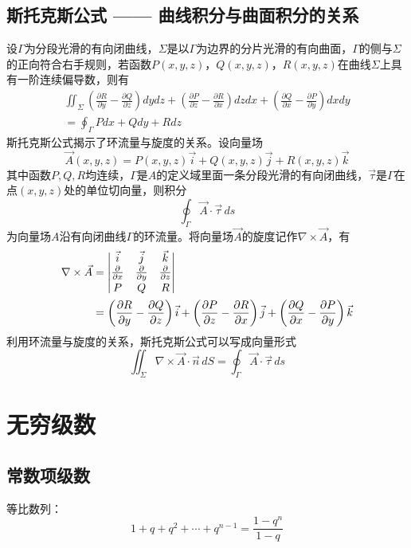 \subsection{斯托克斯公式 —— 曲线积分与曲面积分的关系}
设$\Gamma$为分段光滑的有向闭曲线，$\Sigma$是以$\Gamma$为边界的分片光滑的有向曲面，$\Gamma$的侧与$\Sigma$的正向符合右手规则，若函数$P(x,y,z)$，$Q(x,y,z)$，$R(x,y,z)$在曲线$\Sigma$上具有一阶连续偏导数，则有
\begin{multline*}
\iint_\Sigma\left(\frac{\partial R}{\partial y}-\frac{\partial Q}{\partial z}\right)dydz+
\left(\frac{\partial P}{\partial z}-\frac{\partial R}{\partial x}\right)dzdx+
\left(\frac{\partial Q}{\partial x}-\frac{\partial P}{\partial y}\right)dxdy\\
=\oint_\Gamma Pdx+Qdy+Rdz
\end{multline*}
斯托克斯公式揭示了环流量与旋度的关系。设向量场
\[\vec{A}(x,y,z)=P(x,y,z)\vec{i}+Q(x,y,z)\vec{j}+R(x,y,z)\vec{k}\]
其中函数$P,Q,R$均连续，$\Gamma$是$A$的定义域里面一条分段光滑的有向闭曲线，$\vec{\tau}$是$\Gamma$在点$(x,y,z)$处的单位切向量，则积分
\[\oint_\Gamma \vec{A}\cdot\vec{\tau}\,ds\]
为向量场$A$沿有向闭曲线$\Gamma$的环流量。将向量场$\vec{A}$的旋度记作$\nabla\times \vec{A}$，有
\begin{align*}
\nabla\times\vec{A} &=
\left|
\begin{array}{@{}ccc@{}}
\vec{i}&\vec{j}&\vec{k}\\
\frac{\partial }{\partial x}&\frac{\partial }{\partial y}&\frac{\partial }{\partial z}\\[2pt]
    P&Q&R\\
\end{array}
\right|\\
 &=
\left(\frac{\partial R}{\partial y}-\frac{\partial Q}{\partial z}\right)\vec{i}+
\left(\frac{\partial P}{\partial z}-\frac{\partial R}{\partial x}\right)\vec{j}+
\left(\frac{\partial Q}{\partial x}-\frac{\partial P}{\partial y}\right)\vec{k}
\end{align*}
利用环流量与旋度的关系，斯托克斯公式可以写成向量形式
\[\iint_\Sigma\nabla\times\vec{A}\cdot\vec{n}\,dS=\oint_\Gamma\vec{A}\cdot\vec{\tau}\,ds\]
\section{无穷级数}
\subsection{常数项级数}
等比数列：
\[1+q+q^2+\cdots+q^{n-1}=\frac{1-q^{n}}{1-q}\]

